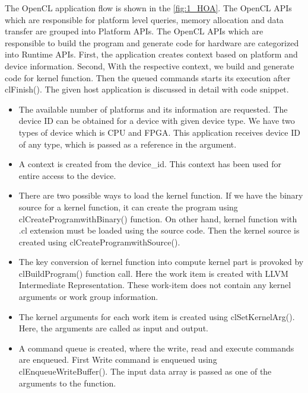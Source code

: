 The OpenCL application flow is shown in the \ref{fig:1_HOA}. The OpenCL APIs which are responsible for platform level queries, memory allocation and data transfer are grouped into Platform APIs. The OpenCL APIs which are responsible to build the program and generate code for hardware are categorized into Runtime APIs. First, the application creates context based on platform and device information. Second, With the respective context, we build and generate code for kernel function. Then the queued commands starts its execution after clFinish(). The given host application is discussed in detail with code snippet.


\begin{itemize}
	\item The available number of platforms and its information are requested. The device ID can be obtained for a device with given device type. We have two types of device which is CPU and FPGA. This application receives device ID of any type, which is passed as a reference in the argument.
	
	\item A context is created from the device\_id. This context has been used for entire access to the device. 
	\item There are two possible ways to load the kernel function. If we have the binary source for a kernel function, it can create the program using clCreateProgramwithBinary() function. On other hand, kernel function with .cl extension must be loaded using the source code. Then the kernel source is created using clCreateProgramwithSource(). 
	\item The key conversion of kernel function into compute kernel part is provoked by clBuildProgram() function call. Here the work item is created with LLVM Intermediate Representation. These work-item does not contain any kernel arguments or work group information. 
	
	\item The kernel arguments for each work item is created using clSetKernelArg(). Here, the arguments are called as input and output. 
	\item A command queue is created, where the write, read and execute commands are enqueued. First Write command is enqueued using clEnqueueWriteBuffer(). The input data array is passed as one of the arguments to the function.

\end{itemize}
